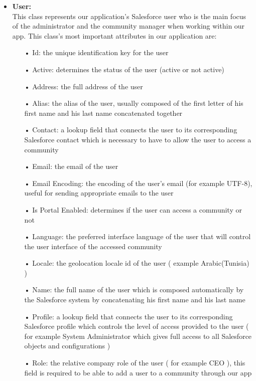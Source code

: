 \begin{itemize}
\item \textbf{User:}\\
This class represents our application's Salesforce user who is the main focus of the administrator and the community manager when working within our app. This class's most important attributes in our application are:
\begin{itemize}
\item[•] Id: the unique identification key for the user 
\item[•] Active: determines the status of the user (active or not active)
\item[•] Address: the full address of the user
\item[•] Alias: the alias of the user, usually composed of the first letter of his first name and his last name concatenated together
\item[•] Contact: a lookup field that connects the user to its corresponding Salesforce contact which is necessary to have to allow the user to access a community
\item[•] Email: the email of the user
\item[•] Email Encoding: the encoding of the user's email (for example UTF-8), useful for sending appropriate emails to the user
\item[•] Is Portal Enabled: determines if the user can access a community or not
\item[•] Language: the preferred interface language of the user that will control the user interface of the accessed community
\item[•] Locale: the geolocation locale id of the user ( example Arabic(Tunisia) )
\item[•] Name: the full name of the user which is composed automatically by the Salesforce system by concatenating his first name and his last name
\item[•] Profile: a lookup field that connects the user to its corresponding Salesforce profile which controls the level of access provided to the user ( for example System Administrator which gives full access to all Salesforce objects and configurations )
\item[•] Role: the relative company role of the user ( for example CEO ), this field is required to be able to add a user to a community through our app

\end{itemize}
\end{itemize}

